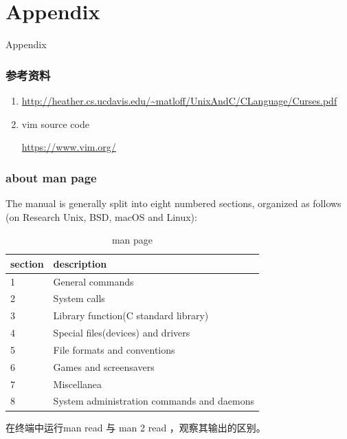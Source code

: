 \documentclass{beamer}
\begin{document}
\section{Appendix}
\begin{frame}
\Huge{\centerline{Appendix}}
\end{frame}
\begin{frame}
\frametitle{参考资料}
\begin{enumerate}
\item
\url{http://heather.cs.ucdavis.edu/~matloff/UnixAndC/CLanguage/Curses.pdf}
\item
vim source code

\url{https://www.vim.org/}
\end{enumerate}
\end{frame}
\begin{frame}
\frametitle{about man page}
The manual is generally split into eight numbered sections, organized as follows (on Research Unix, BSD, macOS and Linux):
\begin{table}
\begin{tabular}{ll}
\toprule
\textbf{section} & \textbf{description} \\
\midrule
1 & General commands\\
 2 & System calls\\
 3& Library function(C standard library)\\
 4 & Special files(devices) and drivers\\
  5 & File formats and conventions\\
  6  & Games and screensavers\\
   7  & Miscellanea\\
   8   & System administration commands and daemons\\  
\bottomrule
\end{tabular}
\caption{man page}
\end{table}

在终端中运行man read 与 man 2 read ，观察其输出的区别。
\end{frame}
\end{document}
